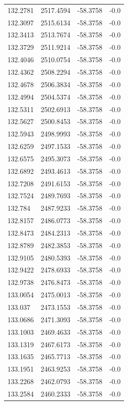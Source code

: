 \begin{table}[H]
\begin{tabular}{llll}
132.2781 & 2517.4594 & -58.3758 & -0.0 \\
132.3097 & 2515.6134 & -58.3758 & -0.0 \\
132.3413 & 2513.7674 & -58.3758 & -0.0 \\
132.3729 & 2511.9214 & -58.3758 & -0.0 \\
132.4046 & 2510.0754 & -58.3758 & -0.0 \\
132.4362 & 2508.2294 & -58.3758 & -0.0 \\
132.4678 & 2506.3834 & -58.3758 & -0.0 \\
132.4994 & 2504.5374 & -58.3758 & -0.0 \\
132.5311 & 2502.6913 & -58.3758 & -0.0 \\
132.5627 & 2500.8453 & -58.3758 & -0.0 \\
132.5943 & 2498.9993 & -58.3758 & -0.0 \\
132.6259 & 2497.1533 & -58.3758 & -0.0 \\
132.6575 & 2495.3073 & -58.3758 & -0.0 \\
132.6892 & 2493.4613 & -58.3758 & -0.0 \\
132.7208 & 2491.6153 & -58.3758 & -0.0 \\
132.7524 & 2489.7693 & -58.3758 & -0.0 \\
132.784 & 2487.9233 & -58.3758 & -0.0 \\
132.8157 & 2486.0773 & -58.3758 & -0.0 \\
132.8473 & 2484.2313 & -58.3758 & -0.0 \\
132.8789 & 2482.3853 & -58.3758 & -0.0 \\
132.9105 & 2480.5393 & -58.3758 & -0.0 \\
132.9422 & 2478.6933 & -58.3758 & -0.0 \\
132.9738 & 2476.8473 & -58.3758 & -0.0 \\
133.0054 & 2475.0013 & -58.3758 & -0.0 \\
133.037 & 2473.1553 & -58.3758 & -0.0 \\
133.0686 & 2471.3093 & -58.3758 & -0.0 \\
133.1003 & 2469.4633 & -58.3758 & -0.0 \\
133.1319 & 2467.6173 & -58.3758 & -0.0 \\
133.1635 & 2465.7713 & -58.3758 & -0.0 \\
133.1951 & 2463.9253 & -58.3758 & -0.0 \\
133.2268 & 2462.0793 & -58.3758 & -0.0 \\
133.2584 & 2460.2333 & -58.3758 & -0.0 \\

\end{tabular}
\end{table}
